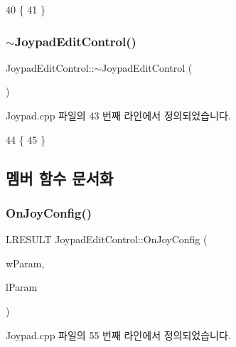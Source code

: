\begin{DoxyCode}
40 \{
41 \}
\end{DoxyCode}
\mbox{\label{class_joypad_edit_control_a1838bf21e560e0af7a5654de050f16ec}} 
\subsubsection{\texorpdfstring{$\sim$\+Joypad\+Edit\+Control()}{~JoypadEditControl()}}
{\footnotesize\ttfamily Joypad\+Edit\+Control\+::$\sim$\+Joypad\+Edit\+Control (\begin{DoxyParamCaption}{ }\end{DoxyParamCaption})\hspace{0.3cm}{\ttfamily [virtual]}}



Joypad.\+cpp 파일의 43 번째 라인에서 정의되었습니다.


\begin{DoxyCode}
44 \{
45 \}
\end{DoxyCode}


\subsection{멤버 함수 문서화}
\mbox{\label{class_joypad_edit_control_a26c5c6132fe22f6947adc741c930504e}} 
\subsubsection{\texorpdfstring{On\+Joy\+Config()}{OnJoyConfig()}}
{\footnotesize\ttfamily L\+R\+E\+S\+U\+LT Joypad\+Edit\+Control\+::\+On\+Joy\+Config (\begin{DoxyParamCaption}\item[{W\+P\+A\+R\+AM}]{w\+Param,  }\item[{L\+P\+A\+R\+AM}]{l\+Param }\end{DoxyParamCaption})}



Joypad.\+cpp 파일의 55 번째 라인에서 정의되었습니다.


